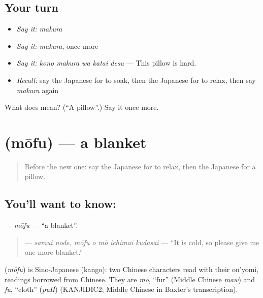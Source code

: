 \subsection*{Your turn}
\begin{itemize}
\raggedright
  \item \emph{Say it:} \emph{makura}
  \item \emph{Say it:} \emph{makura}, once more
  \item \emph{Say it:} \emph{kono makura wa katai desu} — This pillow is hard.
  \item \emph{Recall:} say the Japanese for to soak, then the Japanese for to relax, then say \emph{makura} again
\end{itemize}

\begin{tcolorbox}[breakable,colback=teal!4,colframe=teal!35!black,title={Before you move on}]
What does  mean? (\textquotedblleft{}A pillow\textquotedblright{}.) Say it once more.
\end{tcolorbox}
\section[\texorpdfstring{\ja{もうふ} (mōfu)}{もうふ (mōfu)}]{ (mōfu) — a blanket}

\label{lesson:JA-C399-moufu}



\begin{quote}
Before the new one: say the Japanese for to relax, then the Japanese for a pillow.
\end{quote}

\subsection*{You'll want to know: }
\textbf{} — \emph{mōfu} — \textquotedblleft{}a blanket\textquotedblright{}.

\begin{quote}
\textbf{   } — \emph{samui node, mōfu o mō ichimai kudasai} — \textquotedblleft{}It is cold, so please give me one more blanket.\textquotedblright{}
\end{quote}

\begin{cousinweb}
\textbf{} (\emph{mōfu}) is Sino-Japanese (kango): two Chinese characters read with their on'yomi, readings borrowed from Chinese. They are \emph{mō}, \textquotedblleft{}fur\textquotedblright{} (Middle Chinese \emph{maw}) and \emph{fu}, \textquotedblleft{}cloth\textquotedblright{} (\emph{puH}) (KANJIDIC2; Middle Chinese in Baxter's transcription).
\end{cousinweb}

